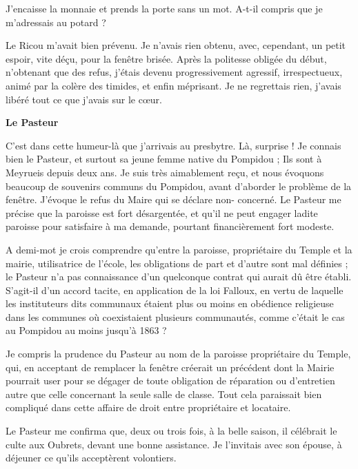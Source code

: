 
J’encaisse la monnaie et prends la porte sans un mot. A-t-il compris que je m’adressais au
potard ?

Le Ricou m’avait bien prévenu. Je n’avais rien obtenu, avec, cependant, un petit espoir, vite
déçu, pour la fenêtre brisée. Après la politesse obligée du début, n’obtenant que des refus,
j’étais devenu progressivement agressif, irrespectueux, animé par la colère des timides, et
enfin méprisant. Je ne regrettais rien, j’avais libéré tout ce que j’avais sur le cœur.

\textbf{Le Pasteur}

C’est dans cette humeur-là que j’arrivais au presbytre. Là, surprise ! Je connais bien le Pasteur,
et surtout sa jeune femme native du Pompidou ; Ils sont à Meyrueis depuis deux ans. Je suis
très aimablement reçu, et nous évoquons beaucoup de souvenirs communs du Pompidou,
avant d’aborder le problème de la fenêtre. J’évoque le refus du Maire qui se déclare non-
concerné. Le Pasteur me précise que la paroisse est fort désargentée, et qu’il ne peut engager
ladite paroisse pour satisfaire à ma demande, pourtant financièrement fort modeste.

A demi-mot je crois comprendre qu’entre la paroisse, propriétaire du Temple et la mairie,
utilisatrice de l’école, les obligations de part et d’autre sont mal définies ; le Pasteur n’a pas
connaissance d’un quelconque contrat qui aurait dû être établi. S’agit-il d’un accord tacite, en
application de la loi Falloux, en vertu de laquelle les instituteurs dits communaux étaient plus
ou moins en obédience religieuse dans les communes où coexistaient plusieurs communautés,
comme c’était le cas au Pompidou au moins jusqu’à 1863 ?

Je compris la prudence du Pasteur au nom de la paroisse propriétaire du Temple, qui, en
acceptant de remplacer la fenêtre créerait un précédent dont la Mairie pourrait user pour se
dégager de toute obligation de réparation ou d’entretien autre que celle concernant la seule
salle de classe. Tout cela paraissait bien compliqué dans cette affaire de droit entre propriétaire
et locataire.

Le Pasteur me confirma que, deux ou trois fois, à la belle saison, il célébrait le culte aux
Oubrets, devant une bonne assistance. Je l’invitais avec son épouse, à déjeuner ce qu’ils
acceptèrent volontiers.

